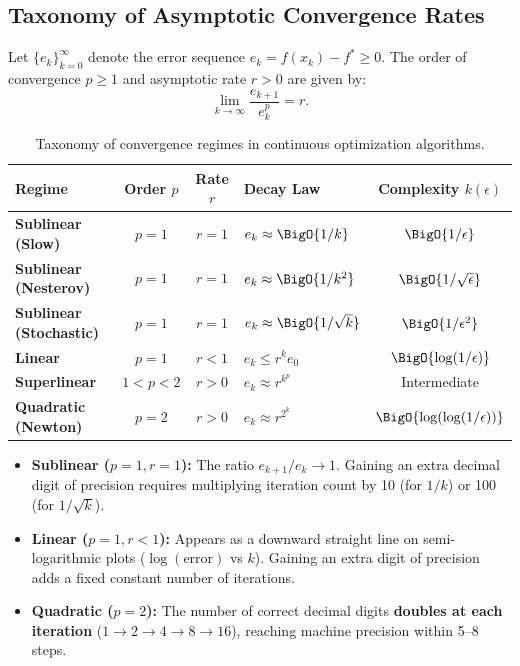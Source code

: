 \subsection{Taxonomy of Asymptotic Convergence Rates}

\begin{definition}
Let $\{e_k\}_{k=0}^\infty$ denote the error sequence $e_k = f(x_k) - f^* \ge 0$. The order of convergence $p \ge 1$ and asymptotic rate $r > 0$ are given by:
\begin{equation}
    \lim_{k \to \infty} \frac{e_{k+1}}{e_k^p} = r.
\end{equation}
\end{definition}

\begin{table}[H]
\centering
\footnotesize
\renewcommand{\arraystretch}{1.3}
\begin{tabularx}{\textwidth}{l c c X c}
\toprule
\textbf{Regime} & \textbf{Order $p$} & \textbf{Rate $r$} & \textbf{Decay Law} & \textbf{Complexity $k(\epsilon)$} \\
\midrule
\textbf{Sublinear (Slow)}    & $p = 1$ & $r = 1$ & $e_k \approx \BigO{1/k}$          & $\BigO{1/\epsilon}$ \\
\textbf{Sublinear (Nesterov)} & $p = 1$ & $r = 1$ & $e_k \approx \BigO{1/k^2}$        & $\BigO{1/\sqrt{\epsilon}}$ \\
\textbf{Sublinear (Stochastic)} & $p = 1$ & $r = 1$ & $e_k \approx \BigO{1/\sqrt{k}}$ & $\BigO{1/\epsilon^2}$ \\
\textbf{Linear}               & $p = 1$ & $r < 1$ & $e_k \le r^k e_0$                 & $\BigO{\log(1/\epsilon)}$ \\
\textbf{Superlinear}          & $1 < p < 2$ & $r > 0$ & $e_k \approx r^{k^p}$           & Intermediate \\
\textbf{Quadratic (Newton)}   & $p = 2$ & $r > 0$ & $e_k \approx r^{2^k}$             & $\BigO{\log(\log(1/\epsilon))}$ \\
\bottomrule
\end{tabularx}
\caption{Taxonomy of convergence regimes in continuous optimization algorithms.}
\label{tab:convergence-regimes-en}
\end{table}

\begin{itemize}
    \item \textbf{Sublinear ($p=1, r=1$):} The ratio $e_{k+1}/e_k \to 1$. Gaining an extra decimal digit of precision requires multiplying iteration count by 10 (for $1/k$) or 100 (for $1/\sqrt{k}$).
    \item \textbf{Linear ($p=1, r<1$):} Appears as a downward straight line on semi-logarithmic plots ($\log(\text{error})$ vs $k$). Gaining an extra digit of precision adds a fixed constant number of iterations.
    \item \textbf{Quadratic ($p=2$):} The number of correct decimal digits \textbf{doubles at each iteration} ($1 \to 2 \to 4 \to 8 \to 16$), reaching machine precision within 5--8 steps.
\end{itemize}

